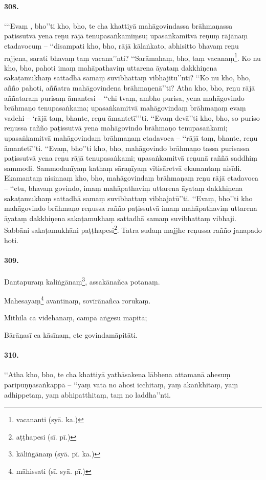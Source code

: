 \paragraph{308.} ‘‘‘Evaṃ , bho’’ti kho, bho, te cha khattiyā mahāgovindassa brāhmaṇassa paṭissutvā yena reṇu rājā tenupasaṅkamiṃsu; upasaṅkamitvā reṇuṃ rājānaṃ etadavocuṃ – ‘‘disampati kho, bho, rājā kālaṅkato, abhisitto bhavaṃ reṇu rajjena, sarati bhavaṃ taṃ vacana’’nti? ‘‘Sarāmahaṃ, bho, taṃ vacanaṃ\footnote{vacananti (syā. ka.)}. Ko nu kho, bho, pahoti imaṃ mahāpathaviṃ uttarena āyataṃ dakkhiṇena sakaṭamukhaṃ sattadhā samaṃ suvibhattaṃ vibhajitu’’nti? ‘‘Ko nu kho, bho, añño pahoti, aññatra mahāgovindena brāhmaṇenā’’ti? Atha kho, bho, reṇu rājā aññataraṃ purisaṃ āmantesi – ‘‘ehi tvaṃ, ambho purisa, yena mahāgovindo brāhmaṇo tenupasaṅkama; upasaṅkamitvā mahāgovindaṃ brāhmaṇaṃ evaṃ vadehi – ‘rājā taṃ, bhante, reṇu āmantetī’’’ti. ‘‘Evaṃ devā’’ti kho, bho, so puriso reṇussa rañño paṭissutvā yena mahāgovindo brāhmaṇo tenupasaṅkami; upasaṅkamitvā mahāgovindaṃ brāhmaṇaṃ etadavoca – ‘‘rājā taṃ, bhante, reṇu āmantetī’’ti. ‘‘Evaṃ, bho’’ti kho, bho, mahāgovindo brāhmaṇo tassa purisassa paṭissutvā yena reṇu rājā tenupasaṅkami; upasaṅkamitvā reṇunā raññā saddhiṃ sammodi. Sammodanīyaṃ kathaṃ sāraṇīyaṃ vītisāretvā ekamantaṃ nisīdi. Ekamantaṃ nisinnaṃ kho, bho, mahāgovindaṃ brāhmaṇaṃ reṇu rājā etadavoca – ‘‘etu, bhavaṃ govindo, imaṃ mahāpathaviṃ uttarena āyataṃ dakkhiṇena sakaṭamukhaṃ sattadhā samaṃ suvibhattaṃ vibhajatū’’ti. ‘‘Evaṃ, bho’’ti kho mahāgovindo brāhmaṇo reṇussa rañño paṭissutvā imaṃ mahāpathaviṃ uttarena āyataṃ dakkhiṇena sakaṭamukhaṃ sattadhā samaṃ suvibhattaṃ vibhaji. Sabbāni sakaṭamukhāni paṭṭhapesi\footnote{aṭṭhapesi (sī. pī.)}. Tatra sudaṃ majjhe reṇussa rañño janapado hoti.

\paragraph{309.} Dantapuraṃ kaliṅgānaṃ\footnote{kāliṅgānaṃ (syā. pī. ka.)}, assakānañca potanaṃ.

Mahesayaṃ\footnote{māhissati (sī. syā. pī.)} avantīnaṃ, sovīrānañca rorukaṃ.

Mithilā ca videhānaṃ, campā aṅgesu māpitā;

Bārāṇasī ca kāsīnaṃ, ete govindamāpitāti.

\paragraph{310.} ‘‘Atha kho, bho, te cha khattiyā yathāsakena lābhena attamanā ahesuṃ paripuṇṇasaṅkappā – ‘‘yaṃ vata no ahosi icchitaṃ, yaṃ ākaṅkhitaṃ, yaṃ adhippetaṃ, yaṃ abhipatthitaṃ, taṃ no laddha’’nti.

